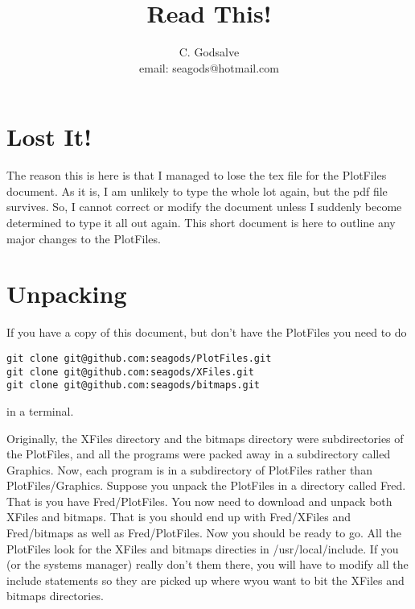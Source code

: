 \documentclass[12pt]{article}
\begin{document}

\thispagestyle{empty}


\title{Read This!}

\author{C. Godsalve \\
   email: seagods@hotmail.com}

\maketitle

\tableofcontents


\section{Lost It!}

The reason this is here is that I managed to lose the tex file for the PlotFiles document. As it is, I am unlikely to type the whole lot again, but the pdf file survives. So, I cannot correct or modify the document unless I suddenly become determined to type it all out again.
This short document is here to outline any major changes to the PlotFiles.

\section{Unpacking}

If you have a copy of this document, but don't have the PlotFiles you need
to  do
\begin{verbatim}
git clone git@github.com:seagods/PlotFiles.git
git clone git@github.com:seagods/XFiles.git
git clone git@github.com:seagods/bitmaps.git
\end{verbatim}
in a terminal.


Originally, the XFiles directory and the bitmaps directory were subdirectories of the PlotFiles, and all the programs were packed away in a subdirectory called Graphics. Now, each program is in a subdirectory of PlotFiles rather than PlotFiles/Graphics. Suppose you unpack the PlotFiles in a directory called Fred.
That is you have Fred/PlotFiles. You now need to download and unpack both
XFiles and bitmaps. That is you should end up with Fred/XFiles and Fred/bitmaps as well as Fred/PlotFiles. Now you should be ready to go.
All the PlotFiles look for the XFiles and bitmaps  directies in /usr/local/include. If you (or the systems manager) really don't them there, you will have to modify all the include statements so they are picked up where wyou want to bit the XFiles and bitmaps directories.
\end{document}
